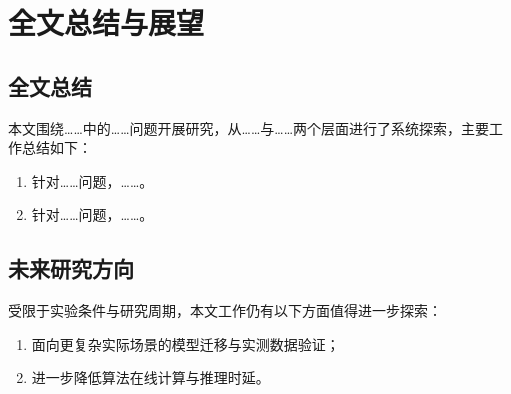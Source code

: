 \chapter{全文总结与展望}

\section{全文总结}
本文围绕……中的……问题开展研究，从……与……两个层面进行了系统探索，主要工作总结如下：
\begin{enumerate}
  \item 针对……问题，……。
  \item 针对……问题，……。
\end{enumerate}

\section{未来研究方向}
受限于实验条件与研究周期，本文工作仍有以下方面值得进一步探索：
\begin{enumerate}
  \item 面向更复杂实际场景的模型迁移与实测数据验证；
  \item 进一步降低算法在线计算与推理时延。
\end{enumerate}
